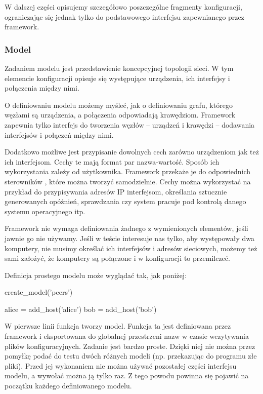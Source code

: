 \documentclass[00-praca-magisterska.tex]{subfiles}
\begin{document}
W dalszej części opisujemy szczegółowo poszczególne fragmenty konfiguracji,
ograniczając się jednak tylko do podstawowego interfejsu zapewnianego przez
framework. 

\subsubsection{Model}

Zadaniem modelu jest przedstawienie koncepcyjnej topologii sieci. W tym
elemencie konfiguracji opisuje się występujące urządzenia, ich interfejsy i
połączenia między nimi.

O definiowaniu modelu możemy myśleć, jak o definiowaniu grafu, którego węzłami
są urządzenia, a połączenia odpowiadają krawędziom. Framework zapewnia tylko
interfejs do tworzenia węzłów -- urządzeń i krawędzi -- dodawania interfejsów
i połączeń między nimi.

Dodatkowo możliwe jest przypisanie dowolnych cech zarówno urządzeniom jak też
ich interfejsom. Cechy te mają format par nazwa-wartość. Sposób ich
wykorzystania zależy od użytkownika. Framework przekaże je do odpowiednich
sterowników , które można
tworzyć samodzielnie. Cechy można wykorzystać na przykład do przypisywania
adresów IP interfejsom, określania sztucznie generowanych opóźnień,
sprawdzania czy system pracuje pod kontrolą danego systemu operacyjnego itp.

Framework nie wymaga definiowania żadnego z wymienionych elementów, jeśli
jawnie go nie używamy. Jeśli w teście interesuje nas tylko, aby występowały
dwa komputery, nie musimy określać ich interfejsów i adresów sieciowych,
możemy też sami założyć, że komputery są połączone i w konfiguracji to
przemilczeć.

Definicja prostego modelu może wyglądać tak, jak poniżej:

\begin{pythoncode}
  create_model('peers')

  alice = add_host('alice')
  bob   = add_host('bob')
\end{pythoncode}

W pierwsze linii funkcja  tworzy model. Funkcja ta jest
definiowana przez framework i eksportowana do globalnej przestrzeni nazw w
czasie wczytywania plików konfiguracyjnych. Zadanie  jest
bardzo proste. Dzięki niej nie można przez pomyłkę podać do testu dwóch
różnych modeli (np. przekazując do programu złe pliki). Przed jej wykonaniem
nie można używać pozostałej części interfejsu modelu, a wywołać można ją tylko
raz. Z tego powodu powinna się pojawić na początku każdego definiowanego
modelu.
\end{document}
